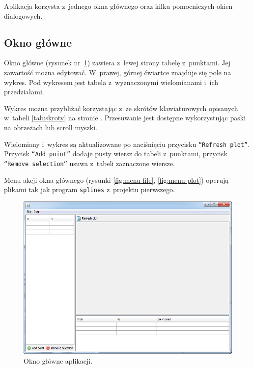 \documentclass[10pt,a4paper]{article}
\newcommand{\prog}[1]{\texttt{#1}}
\begin{document}
Aplikacja korzysta z~jednego okna głównego oraz kilku pomocniczych okien
dialogowych.

\subsection{Okno główne}

Okno główne (rysunek nr~\ref{fig:okno-glowne}) zawiera z~lewej strony
tabelę z~punktami. Jej zawartość można edytować. W~prawej, górnej ćwiartce
znajduje się pole na wykres. Pod wykresem jest tabela z~wyznaczonymi
wielomianami i~ich przedziałami.

Wykres można przybliżać korzystając z~ze skrótów klawiaturowych opisanych
w~tabeli \ref{tab:skroty} na stronie \pageref{tab:skroty}. Przesuwanie jest
dostępne wykorzystując paski na obrzeżach lub scroll myszki.

Wielomiany i~wykres są aktualizowane po naciśnięciu przycisku \prog{``Refresh
plot''}. Przycisk \prog{``Add point''} dodaje pusty wiersz do tabeli
z~punktami, przycisk \prog{``Remove selection''} usuwa z~tabeli zaznaczone
wiersze.

Menu akcji okna głównego (rysunki \ref{fig:menu-file}, \ref{fig:menu-plot})
operują plikami tak jak program \prog{splines} z~projektu pierwszego.

\begin{figure}[hb]
  \centering
  \includegraphics[width=\textwidth]{images/okno-glowne}
  \caption{Okno główne aplikacji.}
  \label{fig:okno-glowne}
\end{figure}
\end{document}
